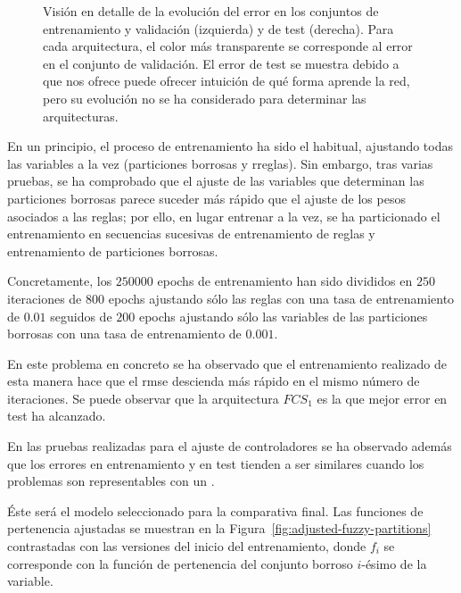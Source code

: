 \begin{figure}
	\centering
	\qquad
	\caption[Evolución del error durante el entrenamiento en las arquitecturas de \acrshort{fcs} para el modelo longitudinal]{Visión en detalle de la evolución del error en los conjuntos de entrenamiento y validación (izquierda) y de test (derecha). Para cada arquitectura, el color más transparente se corresponde al error en el conjunto de validación. El error de test se muestra debido a que nos ofrece puede ofrecer intuición de qué forma aprende la red, pero su evolución no se ha considerado para determinar las arquitecturas.}
	\label{fig:lm-fcs-rmse-all-comparisons}
\end{figure}

En un principio, el proceso de entrenamiento ha sido el habitual, ajustando todas las variables a la vez (particiones borrosas y rreglas). Sin embargo, tras varias pruebas, se ha comprobado que el ajuste de las variables que determinan las particiones borrosas parece suceder más rápido que el ajuste de los pesos asociados a las reglas; por ello, en lugar entrenar a la vez, se ha particionado el entrenamiento en secuencias sucesivas de entrenamiento de reglas y entrenamiento de particiones borrosas.

Concretamente, los $250000$ epochs de entrenamiento han sido divididos en $250$ iteraciones de $800$ epochs ajustando sólo las reglas con una tasa de entrenamiento de $0.01$ seguidos de $200$ epochs ajustando sólo las variables de las particiones borrosas con una tasa de entrenamiento de $0.001$.

En este problema en concreto se ha observado que el entrenamiento realizado de esta manera hace que el \ac{rmse} descienda más rápido en el mismo número de iteraciones. Se puede observar que la arquitectura $FCS_1$ es la que mejor error en test ha alcanzado.

En las pruebas realizadas para el ajuste de controladores se ha observado además que los errores en entrenamiento y en test tienden a ser similares cuando los problemas son representables con un .

Éste será el modelo seleccionado para la comparativa final. Las funciones de pertenencia ajustadas se muestran en la Figura~\ref{fig:adjusted-fuzzy-partitions} contrastadas con las versiones del inicio del entrenamiento, donde $f_i$ se corresponde con la función de pertenencia del conjunto borroso $i$-ésimo de la variable.

